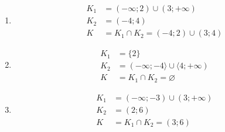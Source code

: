 \documentclass[11pt,a4paper]{article}
\begin{document}
\begin{zadaniReseniBox}[title={Domácí úkol}]
\begin{enumerate}[label=\alph*),itemsep=2pt]
\[\begin{aligned}
K_1&=(-\infty;-1)\cup(1;+\infty)\\[2pt]
K_2&=(-1;3)\\[2pt]
K&=K_1\cap K_2=(1;3)
\end{aligned}\]
\item
\[\begin{aligned}
K_1&=(-\infty;2)\cup(3;+\infty)\\[2pt]
K_2&=(-4;4)\\[2pt]
K&=K_1\cap K_2=(-4;2)\cup(3;4)
\end{aligned}\]
\item
\[\begin{aligned}
K_1&=\{2\}\\[2pt]
K_2&=(-\infty;-4\rangle\cup\langle4;+\infty)\\[2pt]
K&=K_1\cap K_2=\varnothing
\end{aligned}\]
\item
\[\begin{aligned}
K_1&=(-\infty;-3)\cup(3;+\infty)\\[2pt]
K_2&=(2;6)\\[2pt]
K&=K_1\cap K_2=(3;6)
\end{aligned}\]
\end{enumerate}
\end{zadaniReseniBox}
\end{document}
